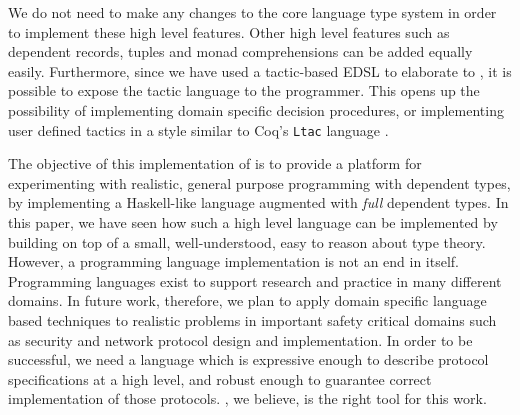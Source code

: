 We do not need to make any changes to the core language type system in order to 
implement these high level features. 
Other high level features such as dependent records, tuples and monad comprehensions
can be added equally easily.  Furthermore, 
since we have used a tactic-based EDSL to elaborate \Idris{} to \TT{}, it is
possible to expose the tactic language to the programmer. This opens up the
possibility of implementing domain specific decision procedures, or implementing
user defined tactics in a style similar to Coq's \texttt{Ltac} language \cite{Bertot2004}.

The objective of this implementation of \Idris{} is to provide a platform
for experimenting with realistic, general purpose programming with dependent
types, by implementing a Haskell-like language augmented with \emph{full}
dependent types.  
In this paper, we have seen how such a high level language can be implemented
by building on top of a small, well-understood, easy to reason about type
theory. 
However, a programming language implementation is not an end in itself. 
Programming languages exist to support research and practice in many different
domains. In future work, therefore, we plan to apply domain specific
language based techniques to realistic problems
in important safety critical domains such as security and network protocol
design and implementation. In order to be successful, we need a language which
is expressive enough to describe protocol specifications at a high level, and robust 
enough to guarantee correct implementation of those protocols. \Idris{}, we believe,
is the right tool for this work.




